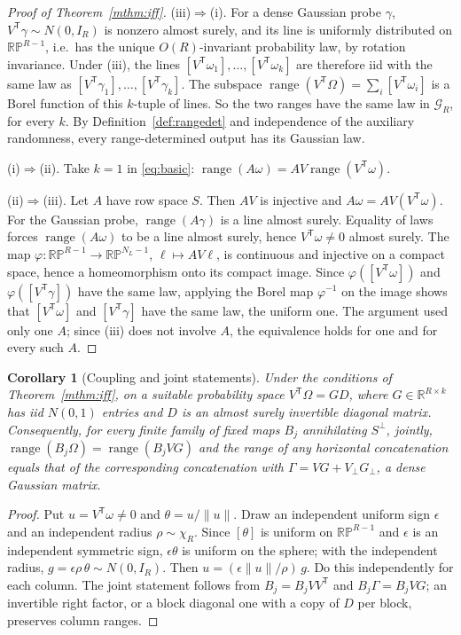 \documentclass[11pt,a4paper]{article}
\newtheorem{corollary}[theorem]{Corollary}
\theoremstyle{definition}
\theoremstyle{remark}
\numberwithin{equation}{section}
\newcommand{\R}{\mathbb R}
\newcommand{\T}{{\mathsf T}}
\newcommand{\range}{\operatorname{range}}
\newcommand{\RP}{\mathbb{RP}}
\newcommand{\norm}[1]{\lVert#1\rVert}
\begin{document}
\begin{proof}[Proof of Theorem~\ref{mthm:iff}]
(iii)$\Rightarrow$(i). For a dense Gaussian probe $\gamma$,
$V^\T\gamma\sim N(0,I_R)$ is nonzero almost surely, and its line is
uniformly distributed on $\RP^{R-1}$, i.e.\ has the unique $O(R)$-invariant
probability law, by rotation invariance. Under (iii), the lines
$[V^\T\omega_1],\ldots,[V^\T\omega_k]$ are therefore iid with the same law as
$[V^\T\gamma_1],\ldots,[V^\T\gamma_k]$. The subspace
$\range(V^\T\Omega)=\sum_i[V^\T\omega_i]$ is a Borel function of this
$k$-tuple of lines. So the two ranges have the same law in $\mathcal G_R$,
for every $k$. By Definition~\ref{def:rangedet} and independence of the
auxiliary randomness, every range-determined output has its Gaussian law.

(i)$\Rightarrow$(ii). Take $k=1$ in \eqref{eq:basic}:
$\range(A\omega)=AV\range(V^\T\omega)$.

(ii)$\Rightarrow$(iii). Let $A$ have row space $S$. Then $AV$ is injective and
$A\omega=AV(V^\T\omega)$. For the Gaussian probe, $\range(A\gamma)$ is a line
almost surely. Equality of laws forces $\range(A\omega)$ to be a line almost
surely, hence $V^\T\omega\ne0$ almost surely. The map
$\varphi\colon\RP^{R-1}\to\RP^{N_L-1}$, $\ell\mapsto AV\ell$, is continuous
and injective on a compact space, hence a homeomorphism onto its compact
image. Since $\varphi([V^\T\omega])$ and $\varphi([V^\T\gamma])$ have the same
law, applying the Borel map $\varphi^{-1}$ on the image shows that
$[V^\T\omega]$ and $[V^\T\gamma]$ have the same law, the uniform one.
The argument used only one $A$; since (iii) does not involve $A$, the
equivalence holds for one and for every such $A$.
\end{proof}

\begin{corollary}[Coupling and joint statements]\label{cor:coupling}
Under the conditions of Theorem~\ref{mthm:iff}, on a suitable probability space
$V^\T\Omega=GD$, where $G\in\R^{R\times k}$ has iid $N(0,1)$ entries and
$D$ is an almost surely invertible diagonal matrix. Consequently, for every
finite family of fixed maps $B_j$ annihilating $S^\perp$, jointly,
$\range(B_j\Omega)=\range(B_jVG)$ and the range of any horizontal concatenation
equals that of the corresponding concatenation with $\Gamma=VG+V_\perp G_\perp$,
a dense Gaussian matrix.
\end{corollary}

\begin{proof}
Put $u=V^\T\omega\ne0$ and $\theta=u/\norm u$. Draw an independent uniform sign
$\epsilon$ and an independent radius $\rho\sim\chi_R$. Since $[\theta]$ is
uniform on $\RP^{R-1}$ and $\epsilon$ is an independent symmetric sign,
$\epsilon\theta$ is uniform on the sphere; with the independent radius,
$g=\epsilon\rho\,\theta\sim N(0,I_R)$. Then $u=(\epsilon\norm u/\rho)\,g$.
Do this independently for each column. The joint statement follows from
$B_j=B_jVV^\T$ and $B_j\Gamma=B_jVG$; an invertible right factor, or a block
diagonal one with a copy of $D$ per block, preserves column ranges.
\end{proof}
\end{document}
